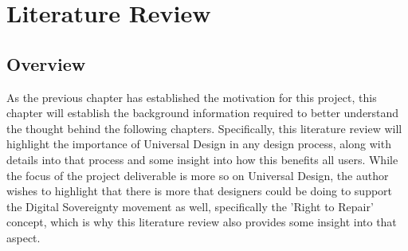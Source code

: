 
\chapter{Literature Review} %

\label{Chapter2} %


\section{Overview} %

As the previous chapter has established the motivation for this project, this chapter will establish the background information required to better understand the thought behind the following chapters.
Specifically, this literature review will highlight the importance of Universal Design in any design process, along with details into that process and some insight into how this benefits all users.
While the focus of the project deliverable is more so on Universal Design, the author wishes to highlight that there is more that designers could be doing to support the Digital Sovereignty movement as well, specifically the 'Right to Repair' concept, which is why this literature review also provides some insight into that aspect.


